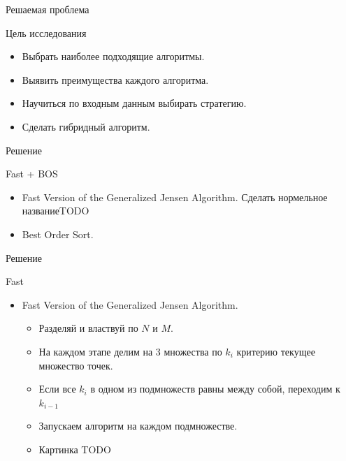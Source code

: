 \documentclass{beamer}
\begin{document}
\begin{frame}{Решаемая проблема}
\begin{block}{Цель исследования}
\begin{itemize}
\item Выбрать наиболее подходящие алгоритмы.
\item Выявить преимущества каждого алгоритма.
\item Научиться по входным данным выбирать стратегию.
\item Сделать гибридный алгоритм.
\end{itemize}
\end{block}
\end{frame}


\begin{frame}{Решение}
\begin{block}{Fast + BOS}
\begin{center}
\end{center}
\begin{itemize}
\item Fast Version of the Generalized Jensen Algorithm. Сделать нормельное названиеTODO 
\item Best Order Sort.
\end{itemize}
\end{block}
\end{frame}

\begin{frame}{Решение}
\begin{block}{Fast}
\begin{center}
\end{center}
\begin{itemize}
\item Fast Version of the Generalized Jensen Algorithm.
\begin{itemize}
\item Разделяй и властвуй по $N$ и $M$. 
\item На каждом этапе делим на 3 множества по $k_i$ критерию текущее множество точек.
\item Если все $k_i$ в одном из подмножеств равны между собой, переходим к $k_{i-1}$
\item Запускаем алгоритм на каждом подмножестве.
\item Картинка TODO
\end{itemize}
\end{itemize}
\end{block}
\end{frame}
\end{document}

